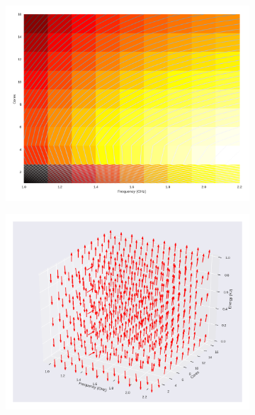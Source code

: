 \begin{figure}[H]

	\centering

	\begin{subfigure}[b]{0.45\textwidth}

		\includegraphics[width=\textwidth]{models/figures/analisys/pleak10.png}

	\end{subfigure}


	\begin{subfigure}[b]{0.45\textwidth}

		\includegraphics[width=\textwidth]{models/figures/analisys/pleak10_3d.png}

	\end{subfigure}

\end{figure}


